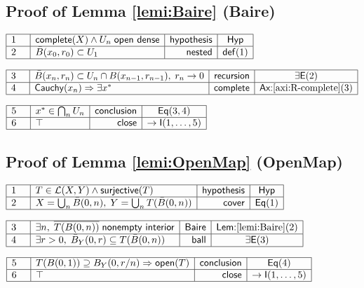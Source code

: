 \documentclass[11pt,reqno]{amsart}
\begin{document}
	\subsection*{Proof of Lemma \protect\ref{lemi:Baire} (\textsf{Baire})}
	\noindent$\begin{array}{|m{0.5cm}|l|r|c|}
	\hline
	1 & \mathsf{complete}(X)\wedge U_{n}\;\mathsf{open\ dense} & \mathsf{hypothesis} & \mathsf{Hyp} \\ \hline
	2 & \bar{B}(x_{0},r_{0})\subset U_{1} & \mathsf{nested} & \mathsf{def}(1) \\ \hline
	\end{array}$
	\par\nointerlineskip\noindent$\begin{array}{|m{0.5cm}|l|r|c|}
	\hline
	3 & \bar{B}(x_{n},r_{n})\subset U_{n}\cap B(x_{n-1},r_{n-1}),\;r_{n}\to0 & \mathsf{recursion} & \exists\mathsf{E}(2) \\ \hline
	4 & \mathsf{Cauchy}(x_{n})\Rightarrow\exists x^{*} & \mathsf{complete} & \textsf{Ax:}\ref{axi:R-complete}(3) \\ \hline
	\end{array}$
	\par\nointerlineskip\noindent$\begin{array}{|m{0.5cm}|l|r|c|}
	\hline
	5 & x^{*}\in\bigcap_{n}U_{n} & \mathsf{conclusion} & \mathsf{Eq}(3,4) \\ \hline
	6 & \top & \mathsf{close} & \to\mathsf{I}(1,\dots,5) \\ \hline
	\end{array}$
	\medskip
	
	\subsection*{Proof of Lemma \protect\ref{lemi:OpenMap} (\textsf{OpenMap})}
	\noindent$\begin{array}{|m{0.5cm}|l|r|c|}
	\hline
	1 & T\in\mathcal{L}(X,Y)\wedge\mathsf{surjective}(T) & \mathsf{hypothesis} & \mathsf{Hyp} \\ \hline
	2 & X=\bigcup_{n}\bar{B}(0,n),\;Y=\bigcup_{n}T(\bar{B}(0,n)) & \mathsf{cover} & \mathsf{Eq}(1) \\ \hline
	\end{array}$
	\par\nointerlineskip\noindent$\begin{array}{|m{0.5cm}|l|r|c|}
	\hline
	3 & \exists n,\;\overline{T(B(0,n))}\;\mathsf{nonempty\ interior} & \mathsf{Baire} & \textsf{Lem:}\ref{lemi:Baire}(2) \\ \hline
	4 & \exists r>0,\;\bar{B}_{Y}(0,r)\subseteq T(\bar{B}(0,n)) & \mathsf{ball} & \exists\mathsf{E}(3) \\ \hline
	\end{array}$
	\par\nointerlineskip\noindent$\begin{array}{|m{0.5cm}|l|r|c|}
	\hline
	5 & T(B(0,1))\supseteq B_{Y}(0,r/n)\Rightarrow\mathsf{open}(T) & \mathsf{conclusion} & \mathsf{Eq}(4) \\ \hline
	6 & \top & \mathsf{close} & \to\mathsf{I}(1,\dots,5) \\ \hline
	\end{array}$
	\medskip
	
\end{document}
